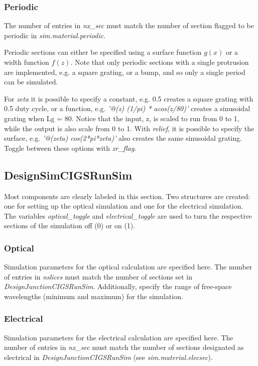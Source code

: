 \documentclass[10pt]{article}
\begin{document}
\subsubsection{Periodic}
The number of entries in \emph{nx\_sec} must match the number of section flagged to be periodic in \emph{sim.material.periodic}.

Periodic sections can either be specified using a surface function $g(x)$ or a width function $f(z)$. Note that only periodic sections with a single protrusion are implemented, e.g. a square grating, or a bump, and so only a single period can be simulated.

For \emph{zeta} it is possible to specify a constant, e.g. 0.5 creates a square grating with 0.5 duty cycle, or a function, e.g. \emph{'@(z) (1/pi) * acos(z/80)'} creates a sinusoidal grating when Lg = 80. Notice that the input, z, is scaled to run from 0 to 1, while the output is also scale from 0 to 1. With \emph{relief}, it is possible to specify the surface, e.g. \emph{'@(zeta) cos(2*pi*zeta)'} also creates the same sinusoidal grating. Toggle between these options with \emph{zr\_flag}.


\subsection{DesignSimCIGSRunSim}
Most components are clearly labeled in this section. Two structures are created: one for setting up the optical simulation and one for the electrical simulation. The variables \emph{optical\_toggle} and \emph{electrical\_toggle} are used to turn the respective sections of the simulation off (0) or on (1).

\subsubsection{Optical}
Simulation parameters for the optical calculation are specified here. The number of entries in \emph{nslices} must match the number of sections set in \emph{DesignJunctionCIGSRunSim}. Additionally, specify the range of free-space wavelengths (minimum and maximum) for the simulation.
 
\subsubsection{Electrical}
Simulation parameters for the electrical calculation are specified here. The number of entries in \emph{nx\_sec} must match the number of sections designated as electrical in \emph{DesignJunctionCIGSRunSim} (see \emph{sim.material.elecsec}).
\end{document}
